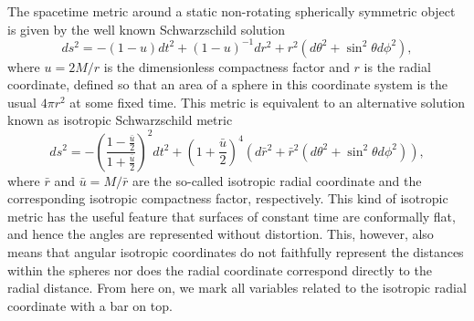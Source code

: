 \documentclass{aa}
\newcommand{\be}{\begin{equation}}
\newcommand{\ee}{\end{equation}}
\newcommand{\sch}{Schwarzschild }
\newcommand{\rb}{\ensuremath{\bar{r}}}
\newcommand{\ub}{\ensuremath{\bar{u}}}
\begin{document}
The spacetime metric around a static non-rotating spherically symmetric object is given by the well known \sch solution
\be
ds^2  = -(1-u) dt^2 + (1-u)^{-1}dr^2+r^2(d\theta^2+\sin^2\theta d\phi^2),
\ee
where $u = 2M/r$ is the dimensionless compactness factor and $r$ is the radial coordinate, defined so that an area of a sphere in this coordinate system is the usual $4\pi r^2$ at some fixed time.
This metric is equivalent to an alternative solution known as isotropic \sch metric \citep[see e.g.][]{MTW73}
\be
\label{eq:ISch}
ds^2 = -\left( \frac{1-\frac{\ub}{2}}{1+\frac{\ub}{2}} \right)^2 dt^2 + (1+\frac{\ub}{2})^4(d\rb^2 + \rb^2(d\theta^2+\sin^2\theta d\phi^2)),
\ee
where  $\rb$ and $\ub=M/\rb$ are the so-called isotropic radial
coordinate and the corresponding isotropic compactness factor,
respectively. 
This kind of isotropic metric has the useful feature that surfaces of constant time are conformally flat, and hence the angles are represented without distortion.
This, however, also means that angular isotropic coordinates do not faithfully represent the distances within the spheres nor does the radial coordinate correspond directly to the radial distance.
From here on, we mark all variables related to the isotropic radial coordinate with a bar on top.
\end{document}
